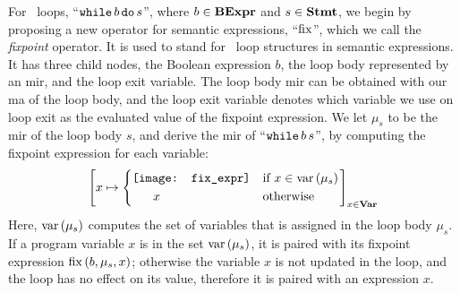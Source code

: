 For \whilelit~loops, ``$\texttt{while}\, b\, \texttt{do}\, s$'', where $b \in \mathbf{BExpr}$
and $s \in \mathbf{Stmt}$, we begin by proposing a new operator for semantic
expressions, ``$\operatorname{\mathrm{fix}}$'', which we call the \emph{fixpoint} operator.  It is
used to stand for \whilelit~loop structures in semantic expressions.  It has
three child nodes, the Boolean expression $b$, the loop body represented by an
\gls{mir}, and the loop exit variable.  The loop body \gls{mir} can be obtained
with our \gls{ma} of the loop body, and the loop exit variable denotes which
variable we use on loop exit as the evaluated value of the fixpoint expression.
We let $\mu_s$ to be the \gls{mir} of the loop body $s$, and derive the
\gls{mir} of ``$\texttt{while}\, b\, s$'', by computing the fixpoint expression for
each variable:
\begin{equation}
    \left[
        x \mapsto \left\{
            \begin{aligned}
                & \begin{aligned}
                    \texttt{[image: fix\_expr]}
                \end{aligned} && \text{if~} x \in \mathrm{var}\left(\mu_s\right) \\
                & \quad ~ ~ x && \text{otherwise}
            \end{aligned}
        \right.
    \right]_{x \in \mathbf{Var}}
    \label{po:eq:mir_while}
\end{equation}
Here, $\mathrm{var}\left(\mu_s\right)$ computes the set of variables that is assigned in the
loop body $\mu_s$.  If a program variable $x$ is in the set $\mathrm{var}\left(\mu_s\right)$,
it is paired with its fixpoint expression $\operatorname{\mathrm{fix}}\left({b, \mu_s, x}\right)$; otherwise
the variable $x$ is not updated in the loop, and the loop has no effect on its
value, therefore it is paired with an expression $x$.
